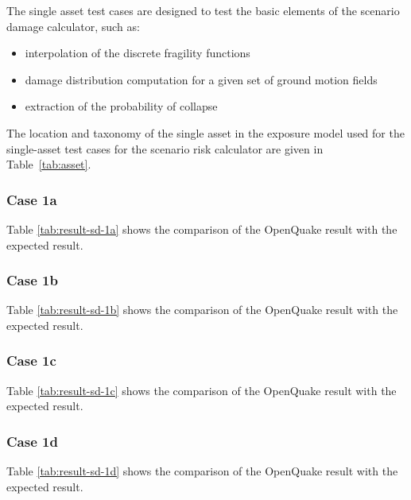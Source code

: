 The single asset test cases are designed to test the basic elements of the scenario damage calculator, such as:

\begin{itemize}
\item interpolation of the discrete fragility functions
\item damage distribution computation for a given set of ground motion fields
\item extraction of the probability of collapse
\end{itemize}

The location and taxonomy of the single asset in the exposure model used for the single-asset test cases for the scenario risk calculator are given in Table~\ref{tab:asset}.

\subsubsection{Case 1a}


Table \ref{tab:result-sd-1a} shows the comparison of the OpenQuake result with the expected result.

\subsubsection{Case 1b}


Table \ref{tab:result-sd-1b} shows the comparison of the OpenQuake result with the expected result.

\subsubsection{Case 1c}


Table \ref{tab:result-sd-1c} shows the comparison of the OpenQuake result with the expected result.

\subsubsection{Case 1d}


Table \ref{tab:result-sd-1d} shows the comparison of the OpenQuake result with the expected result.
